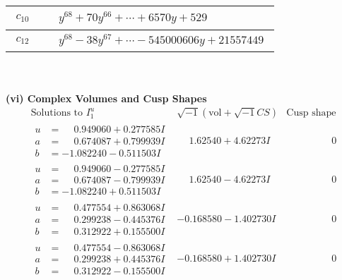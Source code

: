 \documentclass[1p]{elsarticle_modified}
\theoremstyle{definition}
\newcommand{\I}{\sqrt{-1}}
\begin{document}
\begin{tabular}{m{50pt}|m{274pt}}
\hline $$\begin{aligned}c_{10}\end{aligned}$$&$\begin{aligned}
&y^{68}+70 y^{66}+\cdots+6570 y+529
\end{aligned}$\\
\hline $$\begin{aligned}c_{12}\end{aligned}$$&$\begin{aligned}
&y^{68}-38 y^{67}+\cdots-545000606 y+21557449
\end{aligned}$\\
\hline
\end{tabular}\\~\\
\newpage\flushleft \textbf{(vi) Complex Volumes and Cusp Shapes}
$$\begin{array}{c|c|c}  
\text{Solutions to }I^u_{1}& \I (\text{vol} + \sqrt{-1}CS) & \text{Cusp shape}\\
 \hline 
\begin{aligned}
u &= \phantom{-}0.949060 + 0.277585 I \\
a &= \phantom{-}0.674087 + 0.799939 I \\
b &= -1.082240 - 0.511503 I\end{aligned}
 & \phantom{-}1.62540 + 4.62273 I & \phantom{-0.000000 } 0 \\ \hline\begin{aligned}
u &= \phantom{-}0.949060 - 0.277585 I \\
a &= \phantom{-}0.674087 - 0.799939 I \\
b &= -1.082240 + 0.511503 I\end{aligned}
 & \phantom{-}1.62540 - 4.62273 I & \phantom{-0.000000 } 0 \\ \hline\begin{aligned}
u &= \phantom{-}0.477554 + 0.863068 I \\
a &= \phantom{-}0.299238 - 0.445376 I \\
b &= \phantom{-}0.312922 + 0.155500 I\end{aligned}
 & -0.168580 - 1.402730 I & \phantom{-0.000000 } 0 \\ \hline\begin{aligned}
u &= \phantom{-}0.477554 - 0.863068 I \\
a &= \phantom{-}0.299238 + 0.445376 I \\
b &= \phantom{-}0.312922 - 0.155500 I\end{aligned}
 & -0.168580 + 1.402730 I & \phantom{-0.000000 } 0 \\ \hline\begin{aligned}

\end{aligned}
\end{array}$$
\end{document}

